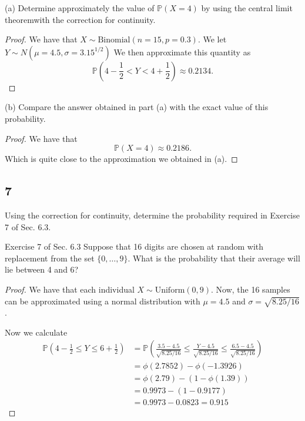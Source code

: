 \documentclass{article}
\renewcommand{\P}[1]{\mathbb{P}\left(#1\right)}
\newcommand{\clt}{central limit theorem}
\begin{document}
(a) Determine approximately the value of $\P{X=4}$ by using the \clt with the correction
for continuity.

\begin{proof}
    We have that $X \sim \text{Binomial}(n=15, p = 0.3)$. We let
    $Y \sim N(\mu = 4.5, \sigma = 3.15^{1/2})$
    We then approximate this quantity as
    \begin{equation*}
        \P{4 - \frac{1}{2} < Y < 4 + \frac{1}{2}} \approx 0.2134.
    \end{equation*}
\end{proof}

(b) Compare the answer obtained in part (a) with the exact value of this probability.
\begin{proof}
    We have that
    \begin{equation*}
        \P{X=4} \approx 0.2186.
    \end{equation*}
    Which is quite close to the approximation we obtained in (a).
\end{proof}

\subsection*{7}
Using the correction for continuity, determine the probability required in Exercise 7
of Sec. 6.3.

Exercise 7 of Sec. 6.3
Suppose that 16 digits are chosen at random with replacement from the set
$\{0,\dots,9\}$. What is the probability that their average will lie between 4 and 6?

\begin{proof}
    We have that each individual $X \sim \text{Uniform}(0,9)$.
    Now, the 16 samples can be approximated
    using a normal distribution with $\mu = 4.5$ and $\sigma = \sqrt{8.25/16}$.

    Now we calculate
    \begin{align*}
        \P{4-\frac{1}{2} \leq Y \leq 6 + \frac{1}{2}}
         & = \P{\frac{3.5 - 4.5}{\sqrt{8.25/16}} \leq \frac{Y - 4.5}{\sqrt{8.25/16}} \leq \frac{6.5 - 4.5}{\sqrt{8.25/16}}} \\
         & = \phi(2.7852) - \phi(-1.3926)                                                                                   \\
         & = \phi(2.79) - (1 -\phi(1.39))                                                                                   \\
         & = 0.9973 - (1 - 0.9177)                                                                                          \\
         & = 0.9973 - 0.0823 = 0.915
    \end{align*}
\end{proof}
\end{document}

